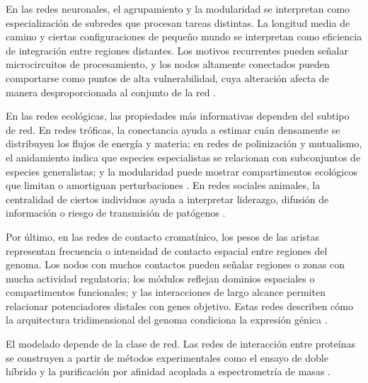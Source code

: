 \documentclass[11pt]{article}
\begin{document}
En las redes neuronales, el agrupamiento y la modularidad se interpretan como especialización de subredes que procesan tareas distintas. La longitud media de camino y ciertas configuraciones de pequeño mundo se interpretan como eficiencia de integración entre regiones distantes. Los motivos recurrentes pueden señalar microcircuitos de procesamiento, y los nodos altamente conectados pueden comportarse como puntos de alta vulnerabilidad, cuya alteración afecta de manera desproporcionada al conjunto de la red \parencite{Mittal2024,BullmoreSporns2009}. 


En las redes ecológicas, las propiedades más informativas dependen del subtipo de red. En redes tróficas, la conectancia ayuda a estimar cuán densamente se distribuyen los flujos de energía y materia; en redes de polinización y mutualismo, el anidamiento indica que especies especialistas se relacionan con subconjuntos de especies generalistas; y la modularidad puede mostrar compartimentos ecológicos que limitan o amortiguan perturbaciones \parencite{Dunne2002,Olesen2007,Bascompte2009}. En redes sociales animales, la centralidad de ciertos individuos ayuda a interpretar liderazgo, difusión de información o riesgo de transmisión de patógenos \parencite{KrauseLusseauJames2009}. 

Por último, en las redes de contacto cromatínico, los pesos de las aristas representan frecuencia o intensidad de contacto espacial entre regiones del genoma. Los nodos con muchos contactos pueden señalar regiones o zonas con mucha actividad regulatoria; los módulos reflejan dominios espaciales o compartimentos funcionales; y las interacciones de largo alcance permiten relacionar potenciadores distales con genes objetivo. Estas redes describen cómo la arquitectura tridimensional del genoma condiciona la expresión génica \parencite{Beagrie2017}.
 



El modelado depende de la clase de red. Las redes de interacción entre proteínas se construyen a partir de métodos experimentales como el ensayo de doble híbrido y la purificación por afinidad acoplada a espectrometría de masas \parencite{Koutrouli2020}.
\end{document}
